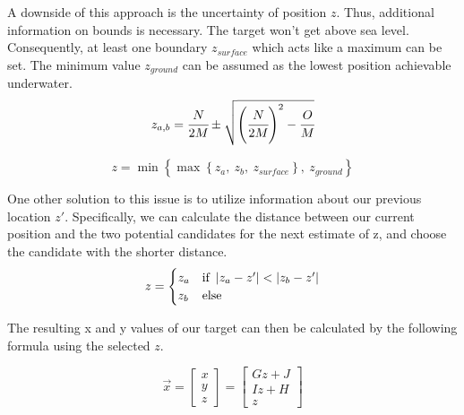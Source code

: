 %
%
%
%
%

A downside of this approach is the uncertainty of position $z$. Thus, additional information on bounds is necessary. The target won't get above sea level. Consequently, at least one boundary $z_{surface}$ which acts like a maximum can be set. The minimum value $z_{ground}$ can be assumed as the lowest position achievable underwater. 
\begin{equation}
	z_{a,b}=\cfrac{{N}}{2{M}}\pm\sqrt{\left(\cfrac{{N}}{2{M}}\right)^2-\cfrac{{O}}{{M}}}
\end{equation}	

\begin{equation}
	z=\min\left\{\max\left\{z_a,~z_b,~z_{surface}\right\},~z_{ground}\right\}
\end{equation}	

One other solution to this issue is to utilize information about our previous location $z'$. Specifically, we can calculate the distance between our current position and the two potential candidates for the next estimate of z, and choose the candidate with the shorter distance.
\begin{equation}
	z=\begin{cases}
		z_a & \text{if }\left|{z_a-z'}\right|<\left|{z_b-z'}\right|\\
		z_b & \text{else}
	\end{cases}
\end{equation}	

The resulting x and y values of our target can then be calculated by the following formula using the selected $z$.

\begin{equation}
			\vec{x}
	=\left[
	\begin{array}{c}
		x\\
		y\\
		z
	\end{array}
	\right]
=\left[
	\begin{array}{c}
		{G}z+{J}\\
		{I}z+{H}\\
		z
	\end{array}
	\right]
\end{equation}	


